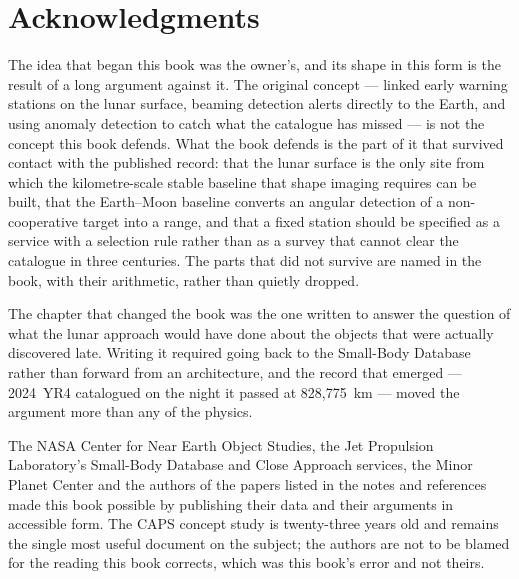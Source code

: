 {}
\printindex
\clearpage

\chapter*{Acknowledgments}
\thispagestyle{plain}

The idea that began this book was the owner's, and its shape in this form
is the result of a long argument against it. The original concept --- linked
early warning stations on the lunar surface, beaming detection alerts
directly to the Earth, and using anomaly detection to catch what the
catalogue has missed --- is not the concept this book defends. What the book
defends is the part of it that survived contact with the published record:
that the lunar surface is the only site from which the kilometre-scale stable
baseline that shape imaging requires can be built, that the Earth--Moon
baseline converts an angular detection of a non-cooperative target into a
range, and that a fixed station should be specified as a service with a
selection rule rather than as a survey that cannot clear the catalogue in
three centuries. The parts that did not survive are named in the book, with
their arithmetic, rather than quietly dropped.

The chapter that changed the book was the one written to answer the
question of what the lunar approach would have done about the objects that
were actually discovered late. Writing it required going back to the
Small-Body Database rather than forward from an architecture, and the
record that emerged --- 2024~YR4 catalogued on the night it passed at
828,775~km --- moved the argument more than any of the physics.

The NASA Center for Near Earth Object Studies, the Jet Propulsion Laboratory's
Small-Body Database and Close Approach services, the Minor Planet Center and
the authors of the papers listed in the notes and references made this book
possible by publishing their data and their arguments in accessible form.
The CAPS concept study is twenty-three years old and remains the single most
useful document on the subject; the authors are not to be blamed for the
reading this book corrects, which was this book's error and not theirs.

